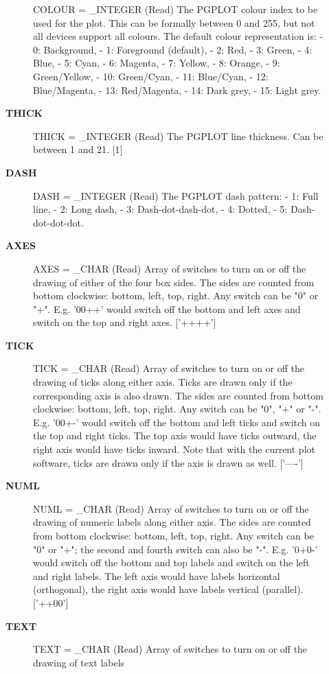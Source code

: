 \begin{description}
\begin{description}
COLOUR = _INTEGER (Read)
   The PGPLOT colour index to be used for the plot. This can be
   formally between 0 and 255, but not all devices support all
   colours. The default colour representation is:
   -  0: Background,         -  1: Foreground (default),
   -  2: Red,                -  3: Green,
   -  4: Blue,               -  5: Cyan,
   -  6: Magenta,            -  7: Yellow,
   -  8: Orange,             -  9: Green/Yellow,
   -  10: Green/Cyan,        -  11: Blue/Cyan,
   -  12: Blue/Magenta,      -  13: Red/Magenta,
   -  14: Dark grey,         -  15: Light grey.
\item [{\bf THICK}]
THICK = _INTEGER (Read)
   The PGPLOT line thickness. Can be between 1 and 21. [1]
\item [{\bf DASH}]
DASH = _INTEGER (Read)
   The PGPLOT dash pattern:
   -  1: Full line,
   -  2: Long dash,
   -  3: Dash-dot-dash-dot,
   -  4: Dotted,
   -  5: Dash-dot-dot-dot.
\item [{\bf AXES}]
AXES = _CHAR (Read)
   Array of switches to turn on or off the drawing of either of
   the four box sides. The sides are counted from bottom
   clockwise: bottom, left, top, right. Any switch can be
   "0" or "+". E.g. '00++' would switch off the bottom and left
   axes and switch on the top and right axes. ['++++']
\item [{\bf TICK}]
TICK = _CHAR (Read)
   Array of switches to turn on or off the drawing of ticks along
   either axis. Ticks are drawn only if the corresponding axis is
   also drawn. The sides are counted from bottom
   clockwise: bottom, left, top, right. Any switch can be
   "0", "+" or "-". E.g. '00+-' would switch off the bottom and
   left ticks and switch on the top and right ticks. The top axis
   would have ticks outward, the right axis would have ticks
   inward.
   Note that with the current plot software, ticks are drawn only
   if the axis is drawn as well. ['----']
\item [{\bf NUML}]
NUML = _CHAR (Read)
   Array of switches to turn on or off the drawing of numeric
   labels along either axis. The sides are counted from bottom
   clockwise: bottom, left, top, right. Any switch can be
   "0" or "+"; the second and fourth switch can also be "-". E.g.
   '0+0-' would switch off the bottom and top labels and switch
   on the left and right labels. The left axis would have labels
   horizontal (orthogonal), the right axis would have labels
   vertical (parallel). ['++00']
\item [{\bf TEXT}]
TEXT = _CHAR (Read)
   Array of switches to turn on or off the drawing of text labels

\end{description}
\end{description}
